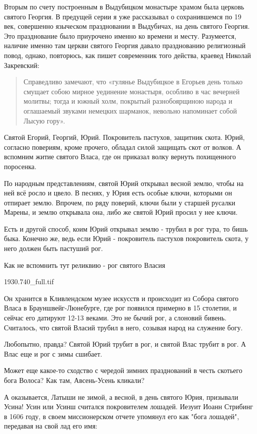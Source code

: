\documentclass[a5paper,11pt,openany]{article}
\begin{document}
   Вторым по счету построенным в Выдубицком монастыре храмом была церковь святого Георгия. В предущей серии я уже рассказывал о сохранившемся по 19 век, совершенно языческом праздновании в Выдубичах, на день святого Георгия. Это празднование было приурочено именно ко времени и месту. Разумеется, наличие именно там церкви святого Георгия давало празднованию религиозный повод, однако, повторюсь, как пишет современник того действа, краевед Николай Закревский:

\begin{quotation}
\noindent Справедливо замечают, что «гулянье Выдубицкое в Егорьев день только смущает собою мирное уединение монастыря, особливо в час вечерней молитвы; тогда и южный холм, покрытый разнобоярщиною народа и оглашаемый звуками немецких шарманок, невольно напоминает собой Лысую гору».\end{quotation}

   Святой Егорий, Георгий, Юрий. Покровитель пастухов, защитник скота. Юрий, согласно повериям, кроме прочего, обладал силой защищать скот от волков. А вспомним житие святого Власа, где он приказал волку вернуть похищенного поросенка.

   По народным представлениям, святой Юрий открывал весной землю, чтобы на ней всё росло и цвело. В песнях, у Юрия есть особые ключи, которыми он отпирает землю. Впрочем, по ряду поверий, ключи были у старшей русалки Марены, и землю открывала она, либо же святой Юрий просил у нее ключи.

   Есть и другой способ, коим Юрий открывал землю - трубил в рог тура, то бишь быка. Конечно же, ведь если Юрий - покровитель пастухов покровитель скота, у него должен быть пастуший рог.

   Как не вспомнить тут реликвию - рог святого Власия

   1930.740_full.tif
   
   Он хранится в Кливлендском музее искусств и происходит из Собора святого Власа в Брауншвейг-Люнебурге, где рог появился примерно в 15 столетии, и сейчас его датируют 12-13 веками. Это не бычий рог, а слоновий бивень. Считалось, что святой Власий трубил в него, созывая народ на служение богу.

   Любопытно, правда? Святой Юрий трубит в рог, и святой Влас трубит в рог. А Влас еще и рог с зимы сшибает.

   Может еще какое-то сходство с чередой зимних празднований в честь скотьего бога Волоса? Как там, Авсень-Усень кликали?

   А оказывается, Латыши не зимой, а весной, в день святого Юрия, призывали Усина! Усин или Усинш считался покровителем лошадей. Иезуит Иоанн Стрибинг в 1606 году, в своем миссионерском отчете упомянул его как "бога лошадей", передавая на свой лад его имя:
\end{document}
